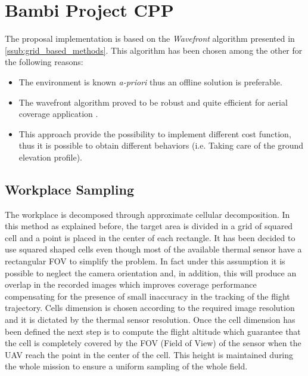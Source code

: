 
\section{Bambi Project CPP} %
\label{sec:proposal_solution}
The proposal implementation is based on the \textit{Wavefront} algorithm presented in \autoref{ssub:grid_based_methods}.
This algorithm has been chosen among the other for the following reasons:
\begin{itemize}
	\item The environment is known \textit{a-priori} thus an offline solution is preferable.
	\item The wavefront algorithm proved to be robust and quite efficient for aerial coverage application \cite{7496385}.
	\item This approach provide the possibility to implement different cost function, thus it is possible to obtain different behaviors (i.e. Taking care of the ground elevation profile).
\end{itemize}

\subsection{Workplace Sampling} %
\label{sub:workplace_sampling}
The workplace is decomposed through approximate cellular decomposition. In this method as explained before, the target area is divided in a grid of squared cell and a point is placed in the center of each rectangle. It has been decided to use squared shaped cells even though most of the available thermal sensor have a rectangular FOV to simplify the problem. In fact under this assumption it is possible to neglect the camera orientation and, in addition, this will produce an overlap in the recorded images which improves coverage performance compensating for the presence of small inaccuracy in the tracking of the flight trajectory. Cells dimension is chosen according to the required image resolution and it is dictated by the thermal sensor resolution. Once the cell dimension has been defined the next step is to compute the flight altitude which guarantee that the cell is completely covered by the FOV (Field of View) of the sensor when the UAV reach the point in the center of the cell. This height is maintained during the whole mission to ensure a uniform sampling of the whole field. \par

